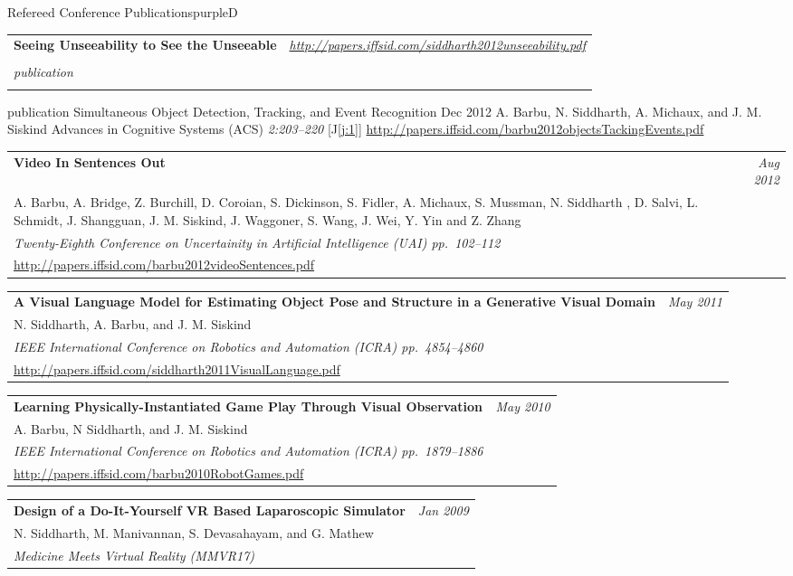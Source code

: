 \documentclass[a4paper]{article}
\makeatletter
\newlength{\itemtextwidth}
\newenvironment{publication}[5]
{ \item
  \begin{tabular*}{\itemtextwidth}{@{}p{5.6in}@{\extracolsep{\fill}}r@{}}
    \textbf{#1} & \textit{#2}\\ #3 &\\ \textit{#4}&\\ #5
  \end{tabular*}
  \vspace*{-2pt}
} {}
\def\item{\addtocounter{enumi}{-2}\oldItem}
\makeatother
\begin{document}
\begin{region}[C][11]{Refereed Conference Publications}{purpleD}
\begin{publication} {Seeing Unseeability to See the Unseeable}
    {\url{http://papers.iffsid.com/siddharth2012unseeability.pdf}}
  \end{publication}
  \begin{publication} {Simultaneous Object Detection, Tracking, and Event Recognition}
    {Dec 2012}
    {A. Barbu, N. Siddharth, A. Michaux, and J. M. Siskind}
    {Advances in Cognitive Systems (ACS) \hfill \emph{2:203--220} [{\color{blueGreen}J\ref{j:1}}]}
    {\url{http://papers.iffsid.com/barbu2012objectsTackingEvents.pdf}}
  \end{publication}
  \begin{publication} {Video In Sentences Out}
    {Aug 2012}
    {A. Barbu, A. Bridge, Z. Burchill, D. Coroian, S. Dickinson, S. Fidler,
      A. Michaux, S. Mussman, N. Siddharth , D. Salvi, L. Schmidt, J. Shangguan,
      J. M. Siskind, J. Waggoner, S. Wang, J. Wei, Y. Yin and Z. Zhang}
    {Twenty-Eighth Conference on Uncertainity in Artificial Intelligence (UAI) \hfill\emph{pp.~102--112}}
    {\url{http://papers.iffsid.com/barbu2012videoSentences.pdf}}
  \end{publication}
  \begin{publication} {A Visual Language Model for Estimating Object
      Pose and Structure in a Generative Visual Domain}
    {May 2011}
    {N. Siddharth, A. Barbu, and J. M. Siskind}
    {IEEE International Conference on Robotics and Automation (ICRA) \hfill \emph{pp.~4854--4860}}
    {\url{http://papers.iffsid.com/siddharth2011VisualLanguage.pdf}}
  \end{publication}
  \begin{publication}{Learning Physically-Instantiated Game Play Through Visual Observation}
    {May 2010}
    {A. Barbu, N Siddharth, and J. M. Siskind}
    {IEEE International Conference on Robotics and Automation (ICRA) \hfill \emph{pp.~1879--1886}}
    {\url{http://papers.iffsid.com/barbu2010RobotGames.pdf}}
  \end{publication}
  \begin{publication} {Design of a Do-It-Yourself VR Based Laparoscopic Simulator}
    {Jan 2009}
    {N. Siddharth, M. Manivannan, S. Devasahayam, and G. Mathew}
    {Medicine Meets Virtual Reality (MMVR17)}
    {} %
  \end{publication}
\end{region}
\end{document}
